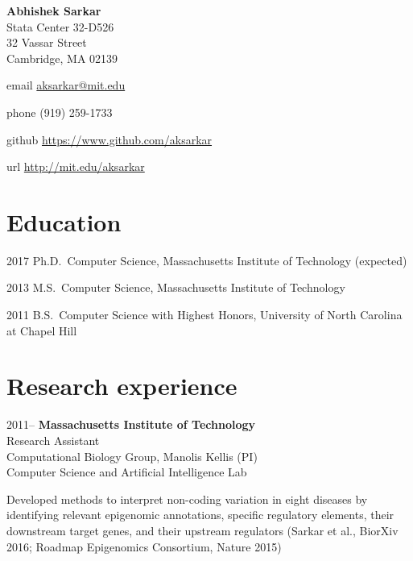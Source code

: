 \documentclass{article}
\begin{document}
{\bfseries\LARGE Abhishek Sarkar\vspace{1em}}\\
Stata Center 32-D526\\
32 Vassar Street\\
Cambridge, MA 02139\vspace{1em}

\begin{hdesc}
\item[email] \url{aksarkar@mit.edu}
\item[phone] (919) 259-1733
\item[github] \url{https://www.github.com/aksarkar}
\item[url] \url{http://mit.edu/aksarkar}
\end{hdesc}

\section*{Education}
\begin{hdesc}
\item[2017] Ph.D.\ Computer Science, Massachusetts Institute of Technology
  (expected)
\item[2013] M.S.\ Computer Science, Massachusetts Institute of Technology
\item[2011] B.S.\ Computer Science with Highest Honors, University of North
  Carolina at Chapel Hill
\end{hdesc}

\section*{Research experience}
\begin{hdesc}[itemsep=1em]
\item[2011--] \textbf{Massachusetts Institute of Technology}\\
Research Assistant\\
Computational Biology Group, Manolis Kellis (PI)\\
Computer Science and Artificial Intelligence Lab
\end{hdesc}

Developed methods to interpret non-coding variation in eight diseases by
identifying relevant epigenomic annotations, specific regulatory elements,
their downstream target genes, and their upstream regulators (Sarkar et al.,
BiorXiv 2016; Roadmap Epigenomics Consortium, Nature 2015)\\
\end{document}
